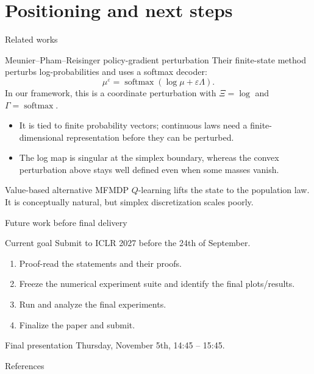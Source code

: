 \documentclass[9pt]{beamer}
\begin{document}
\section{Positioning and next steps}
\begin{frame}{Related works}
\begin{block}{Meunier--Pham--Reisinger policy-gradient perturbation \cite{meunier2026model}}
Their finite-state method perturbs log-probabilities and uses a softmax decoder:
\[
  \mu^\varepsilon=\operatorname{softmax}(\log\mu+\varepsilon\Lambda).
\]
In our framework, this is a coordinate perturbation with $\Xi=\log$ and $\Gamma=\operatorname{softmax}$.
\end{block}

\begin{itemize}
  \item It is tied to finite probability vectors; continuous laws need a finite-dimensional representation before they can be perturbed.
  \item The log map is singular at the simplex boundary, whereas the convex perturbation above stays well defined even when some masses vanish.
\end{itemize}

\begin{block}{Value-based alternative \cite{carmona2023model}}
MFMDP $Q$-learning lifts the state to the population law. It is conceptually natural, but simplex discretization scales poorly.
\end{block}
\end{frame}

  
\begin{frame}{Future work before final delivery}
\begin{block}{Current goal}
  Submit to ICLR 2027 before the 24th of September.
\end{block}

\begin{enumerate}
  \item Proof-read the statements and their proofs.
  \item Freeze the numerical experiment suite and identify the final plots/results.
  \item Run and analyze the final experiments.
  \item Finalize the paper and submit.
\end{enumerate}

\begin{block}{Final presentation}
  Thursday, November 5th, 14:45 -- 15:45.
\end{block}
\end{frame}

\begin{frame}[allowframebreaks]{References}
\printbibliography
\end{frame}
\end{document}
